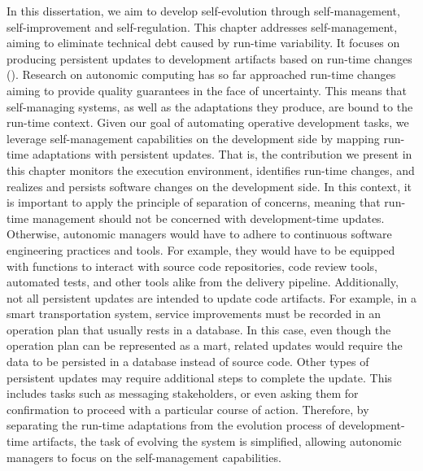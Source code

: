 \label{chapter:delivery-platform}

\minitoc


In this dissertation, we aim to develop self-evolution through self-management, self-improvement and self-regulation. This chapter addresses self-management, aiming to eliminate technical debt caused by run-time variability. It focuses on producing persistent updates to development artifacts based on run-time changes (). Research on autonomic computing has so far approached run-time changes aiming to provide quality guarantees in the face of uncertainty. This means that self-managing systems, as well as the adaptations they produce, are bound to the run-time context. Given our goal of automating operative development tasks, we leverage self-management capabilities on the development side by mapping run-time adaptations with persistent updates. That is, the contribution we present in this chapter monitors the execution environment, identifies run-time changes, and realizes and persists software changes on the development side. In this context, it is important to apply the principle of separation of concerns, meaning that run-time management should not be concerned with development-time updates. Otherwise, autonomic managers would have to adhere to continuous software engineering practices and tools. For example, they would have to be equipped with functions to interact with source code repositories, code review tools, automated tests, and other tools alike from the delivery pipeline. Additionally, not all persistent updates are intended to update code artifacts. For example, in a smart transportation system, service improvements must be recorded in an operation plan that usually rests in a database. In this case, even though the operation plan can be represented as a \gls{mart}, related updates would require the data to be persisted in a database instead of source code. Other types of persistent updates may require additional steps to complete the update. This includes tasks such as messaging stakeholders, or even asking them for confirmation to proceed with a particular course of action. Therefore, by separating the run-time adaptations from the evolution process of development-time artifacts, the task of evolving the system is simplified, allowing autonomic managers to focus on the self-management capabilities.


